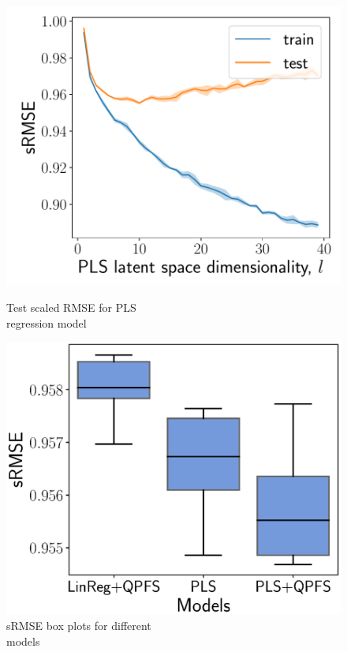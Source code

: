 \documentclass[12pt,oneside]{article}
\theoremstyle{definition}
\begin{document}
\begin{figure}[h]
	\begin{minipage}{.5\linewidth}
		\centering
		\includegraphics[width=1.\linewidth]{figs/pls_vs_k}
		\caption{Test scaled RMSE for PLS \\regression model}
		\label{fig:pls_vs_k}
	\end{minipage}%
	\begin{minipage}{.5\linewidth}
		\centering
		\includegraphics[width=1.\linewidth]{figs/models}
		\caption{sRMSE box plots for different \\models}
		\label{fig:models}
	\end{minipage}
\end{figure}
\end{document}
